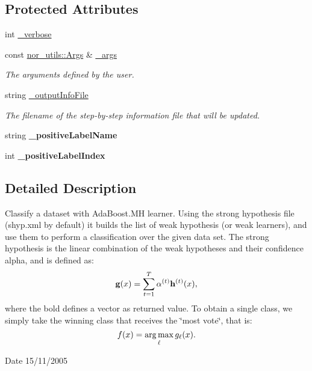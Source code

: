 \subsection*{Protected Attributes}
\begin{DoxyCompactItemize}
\item 
int \hyperlink{classMultiBoost_1_1VJCascadeClassifier_a5c9ad0bad3ee3f055a0d48040e512575}{\-\_\-verbose}
\item 
\hypertarget{classMultiBoost_1_1VJCascadeClassifier_a3bb34f9ca0f58a1bcf5e3d501e4ac201}{const \hyperlink{classnor__utils_1_1Args}{nor\-\_\-utils\-::\-Args} \& \hyperlink{classMultiBoost_1_1VJCascadeClassifier_a3bb34f9ca0f58a1bcf5e3d501e4ac201}{\-\_\-args}}\label{classMultiBoost_1_1VJCascadeClassifier_a3bb34f9ca0f58a1bcf5e3d501e4ac201}

\begin{DoxyCompactList}\small\item\em The arguments defined by the user. \end{DoxyCompactList}\item 
\hypertarget{classMultiBoost_1_1VJCascadeClassifier_a3b848c20481145d2cad17756acba1f56}{string \hyperlink{classMultiBoost_1_1VJCascadeClassifier_a3b848c20481145d2cad17756acba1f56}{\-\_\-output\-Info\-File}}\label{classMultiBoost_1_1VJCascadeClassifier_a3b848c20481145d2cad17756acba1f56}

\begin{DoxyCompactList}\small\item\em The filename of the step-\/by-\/step information file that will be updated. \end{DoxyCompactList}\item 
\hypertarget{classMultiBoost_1_1VJCascadeClassifier_a8d239943188b0fa525ef4b94b5e123b3}{string {\bfseries \-\_\-positive\-Label\-Name}}\label{classMultiBoost_1_1VJCascadeClassifier_a8d239943188b0fa525ef4b94b5e123b3}

\item 
\hypertarget{classMultiBoost_1_1VJCascadeClassifier_a89c62d4d337bc0d34257bbda8890ef69}{int {\bfseries \-\_\-positive\-Label\-Index}}\label{classMultiBoost_1_1VJCascadeClassifier_a89c62d4d337bc0d34257bbda8890ef69}

\end{DoxyCompactItemize}


\subsection{Detailed Description}
Classify a dataset with Ada\-Boost.\-M\-H learner. Using the strong hypothesis file (shyp.\-xml by default) it builds the list of weak hypothesis (or weak learners), and use them to perform a classification over the given data set. The strong hypothesis is the linear combination of the weak hypotheses and their confidence alpha, and is defined as\-: \[ {\bf g}(x) = \sum_{t=1}^T \alpha^{(t)} {\bf h}^{(t)}(x), \] where the bold defines a vector as returned value. To obtain a single class, we simply take the winning class that receives the \char`\"{}most vote\char`\"{}, that is\-: \[ f(x) = \mathop{\rm arg\, max}_{\ell} g_\ell(x). \] \begin{DoxyDate}{Date}
15/11/2005 
\end{DoxyDate}


